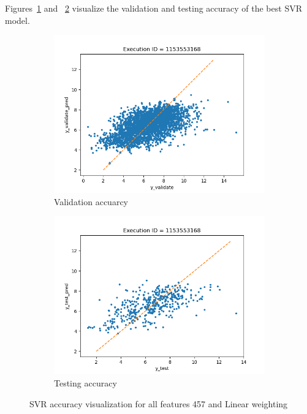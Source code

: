 \documentclass[11pt]{article}
\begin{document}
Figures~\ref{fig:SVRvalidate} and ~\ref{fig:SVRtest} visualize the validation and testing accuracy of the best SVR model.

\begin{figure}
     \centering
     \begin{subfigure}[b]{0.45\textwidth}
         \centering
         \includegraphics[scale=0.45]{images/SVRvalidate}
         \caption{Validation accuarcy}
        \label{fig:SVRvalidate}
     \end{subfigure}
     \hfill
     \begin{subfigure}[b]{0.45\textwidth}
         \centering
         \includegraphics[scale=0.45]{images/SVRtest}
        \caption{Testing accuracy}
        \label{fig:SVRtest}
     \end{subfigure}
     \caption{SVR accuracy visualization for all features 457 and Linear weighting}
     \label{fig:SVRaccuracy}
\end{figure}
\end{document}
